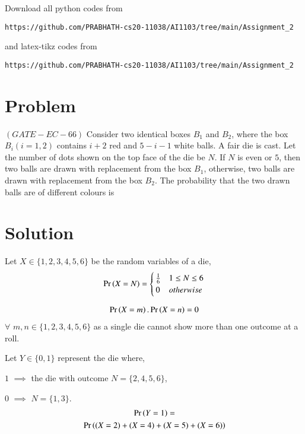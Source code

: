 \documentclass[journal,12pt,twocolumn]{IEEEtran}
\begin{document}
Download all python codes from 
\begin{lstlisting}
https://github.com/PRABHATH-cs20-11038/AI1103/tree/main/Assignment_2
\end{lstlisting}

and latex-tikz codes from
\begin{lstlisting}
https://github.com/PRABHATH-cs20-11038/AI1103/tree/main/Assignment_2
\end{lstlisting}

\section{Problem}

$(GATE-EC-66)$ Consider two identical boxes $B_1$ and $B_2$, where the box $B_i(i = 1, 2)$ contains $i + 2$ red and $5−i−1$ white balls. A fair die is cast. Let the number of dots shown on the top face of the die be $N$. If $N$ is even or $5$, then two balls are drawn with replacement from the box $B_1$, otherwise, two balls are drawn with replacement from the box $B_2$. The probability that the two drawn balls are of different colours is

\section{Solution}

Let $X \in \{1,2,3,4,5,6\}$ be the random variables of a die,
\begin{align}
    \Pr\left(X=N\right) =
    \begin{cases}
    \frac{1}{6} & 1 \leq N \leq 6\\
    0 & otherwise
    \end{cases}
\end{align}

\begin{align}\label{eq1}
    \Pr\left(X=m\right).\Pr\left(X=n\right)=0
\end{align}
$\forall$ $m,n \in \{1,2,3,4,5,6\}$ as a single die cannot show more than one outcome at a roll.

Let $Y \in \{0, 1\}$ represent the die where,

$1$ $\implies$ the die with outcome $N = \{ 2, 4, 5, 6\}$,

$0$ $\implies$ $N = \{ 1, 3\}$.
\begin{multline}
    \Pr\left(Y=1\right)=\\
    \Pr\left((X=2)+(X=4)+(X=5)+(X=6)\right)
\end{multline}
\end{document}
